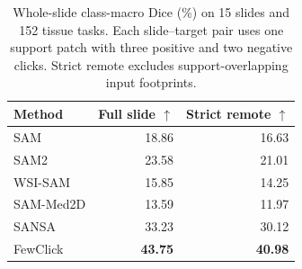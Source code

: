 \begin{table}[t]
\centering
\caption{Whole-slide class-macro Dice (\%) on 15 slides and 152 tissue tasks. Each slide--target pair uses one support patch with three positive and two negative clicks. Strict remote excludes support-overlapping input footprints.}
\label{tab:wsi}
\small
\setlength{\tabcolsep}{4pt}
\begin{tabular}{@{}lrr@{}}
\toprule
Method & Full slide $\uparrow$ & Strict remote $\uparrow$ \\
\midrule
SAM & 18.86 & 16.63 \\
SAM2 & 23.58 & 21.01 \\
WSI-SAM & 15.85 & 14.25 \\
SAM-Med2D & 13.59 & 11.97 \\
SANSA & 33.23 & 30.12 \\
FewClick & \textbf{43.75} & \textbf{40.98} \\
\bottomrule
\end{tabular}
\end{table}
